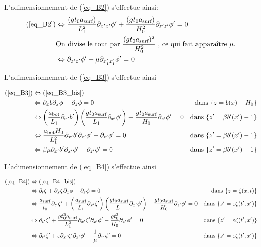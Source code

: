 \documentclass[12pt,a4paper]{article}
\numberwithin{equation}{section}
\begin{document}
L'adimensionnement de (\ref{eq_B2}) s'effectue ainsi:
\begin{align}
    \text{(\ref{eq_B2})} &\Leftrightarrow  \frac{(g t_0 a_{\text{surf}})}{L_1^2}\partial_{x' x'}\phi'+ \frac{(g t_0 a_{\text{surf}})}{H_0^2}\partial_{z' z'}\phi'  = 0\nonumber\\
    &\text{On divise le tout par $ \frac{(g t_0 a_{\text{surf}})^2 }{H_0^2}$ , ce qui fait apparaître $\mu$.}\nonumber\\
    &\Leftrightarrow \partial_{z'z'}\phi' + \mu \partial_{x_1' x_1'}\phi'  = 0 \label{eq_B2_adim}
\end{align}

L'adimensionnement de (\ref{eq_B3}) s'effectue ainsi

\begin{align}
\text{(\ref{eq_B3})} &\Leftrightarrow \text{(\ref{eq_B3_bis})}& ~ \nonumber\\
&\Leftrightarrow \partial_x b \partial_x\phi - \partial_z\phi = 0 & \text{dans }\{z = b(x) - H_0\} \nonumber\\
&\Leftrightarrow \left(\frac{a_{\text{bot}}}{L_1} \partial_{x'} b'\right)\left(\frac{gt_0a_{\text{surf}}}{L_1}\partial_{x'}\phi'\right)  - \frac{gt_0a_{\text{surf}}}{H_0}\partial_{z'}\phi' = 0& \text{dans }\{z' = \beta b'(x') - 1\}\nonumber\\
&\Leftrightarrow  \frac{a_{\text{bot}}H_0}{L_1^2} \partial_{x'} b'  \partial_{x'}\phi'   - \partial_{z'}\phi' = 0& \text{dans }\{z' = \beta b'(x') - 1\}\nonumber\\
&\Leftrightarrow  \beta \mu \partial_{x'} b'  \partial_{x'}\phi'   - \partial_{z'}\phi' = 0& \text{dans }\{z' = \beta b'(x') - 1\}\label{eq_B3_adim}
\end{align}

L'adimensionnement de (\ref{eq_B4}) s'effectue ainsi

\begin{align}
\text{(\ref{eq_B4})} &\Leftrightarrow \text{(\ref{eq_B4_bis})}& ~ \nonumber\\
&\Leftrightarrow \partial_t\zeta + \partial_x \zeta \partial_x\phi - \partial_z\phi = 0 & \text{dans }\{z = \zeta(x,t)\} \nonumber\\
&\Leftrightarrow \frac{a_{\text{surf}}}{t_0}\partial_{t'} \zeta' + \left(\frac{a_{\text{surf}}}{L_1} \partial_{x'} \zeta '\right)\left(\frac{gt_0a_{\text{surf}}}{L_1}\partial_{x'}\phi'\right)  - \frac{gt_0a_{\text{surf}}}{H_0}\partial_{z'}\phi' = 0& \text{dans }\{z' = \varepsilon \zeta(t',x')\}\nonumber\\
&\Leftrightarrow \partial_{t'}\zeta' +  \frac{gt_0^2a_{\text{surf}}}{L_1^2} \partial_{x'} \zeta ' \partial_{x'}\phi'  - \frac{gt_0^2}{H_0}\partial_{z'}\phi' = 0&  \text{dans }\{z' = \varepsilon \zeta(t',x')\} \nonumber \\
&\Leftrightarrow \partial_{t'}\zeta' +  \varepsilon \partial_{x'} \zeta ' \partial_{x'}\phi'  - \frac{1}{\mu}\partial_{z'}\phi' = 0&  \text{dans }\{z' = \varepsilon \zeta(t',x')\} \label{eq_B4_adim}
\end{align}
\end{document}
